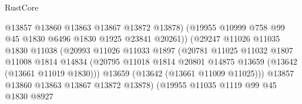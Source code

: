 \begin{lexlean}{RustCore}
\begin{coremodule}
                                        @13857
                                        @13860
                                        @13863
                                        @13867
                                        @13872
                                        @13878)
                                      (@19955
                                        @10999
                                        @758
                                        @99
                                        @45
                                        @1830
                                        @6496
                                        @1830
                                        @1925
                                        @23841
                                        @20261))
                                    (@29247
                                      @11026
                                      @11035
                                      @1830
                                      @11038
                                      (@20993
                                        @11026
                                        @11033
                                        @1897
                                        (@20781
                                          @11025
                                          @11032
                                          @1807
                                          @11008
                                          @1814
                                          @14834
                                          (@20795
                                            @11018
                                            @1814
                                            @20801
                                            @14875
                                            @13659
                                            (@13642 (@13661 @11019 @1830)))
                                          @13659
                                          (@13642 (@13661 @11009 @11025)))
                                        @13857
                                        @13860
                                        @13863
                                        @13867
                                        @13872
                                        @13878)
                                      (@19955
                                        @11035
                                        @1119
                                        @99
                                        @45
                                        @1830
                                        @8927

\end{coremodule}
\end{lexlean}

